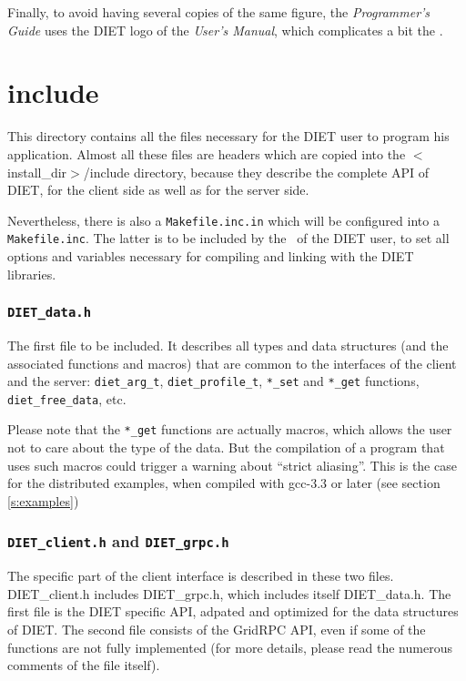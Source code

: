 Finally, to avoid having several copies of the same figure, the
\textit{Programmer's Guide} uses the DIET logo of the \textit{User's Manual},
which complicates a bit the \makeam.



\section{\textsf{include}}
\label{s:include}

This directory contains all the files necessary for the DIET user to program his
application. Almost all these files are headers which are copied into the
\textsf{$<$install\_dir$>$/include} directory, because they describe the
complete API of DIET, for the client side as well as for the server side.

Nevertheless, there is also a \texttt{Makefile.inc.in} which will be configured
into a \texttt{Makefile.inc}. The latter is to be included
by the \make\ of the DIET user, to set all options and variables necessary for
compiling and linking with the DIET libraries.


\subsubsection{\tt DIET\_data.h}

The first file to be included. It describes all types and data structures (and
the associated functions and macros) that are common to the interfaces of the
client and the server: \verb+diet_arg_t+, \verb+diet_profile_t+, \verb+*_set+
and \verb+*_get+ functions, \verb+diet_free_data+, etc.

Please note that the \verb+*_get+ functions are actually macros, which allows
the user not to care about the type of the data. But the compilation of a
program that uses such macros could trigger a warning about ``strict aliasing''.
This is the case for the distributed examples, when compiled with
\textsf{gcc-3.3} or later (see section \ref{s:examples})


\subsubsection{{\tt DIET\_client.h} and {\tt DIET\_grpc.h}}

The specific part of the client interface is described in these two files.
\textsf{DIET\_client.h} includes \textsf{DIET\_grpc.h}, which includes itself
\textsf{DIET\_data.h}.
The first file is the DIET specific API, adpated and optimized for the data
structures of DIET. The second file consists of the GridRPC API, even if some of
the functions are not fully implemented (for more details, please read the
numerous comments of the file itself).



